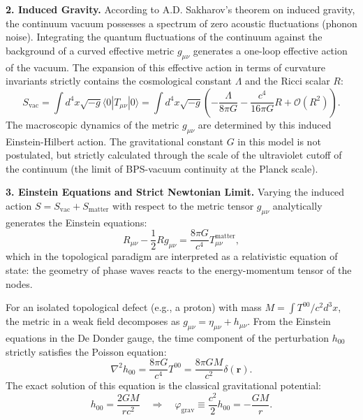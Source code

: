 \documentclass[11pt,a4paper]{article}
\begin{document}
	\textbf{2. Induced Gravity.}
	According to A.D. Sakharov's theorem on induced gravity, the continuum vacuum possesses a spectrum of zero acoustic fluctuations (phonon noise). Integrating the quantum fluctuations of the continuum against the background of a curved effective metric $g_{\mu\nu}$ generates a one-loop effective action of the vacuum. 
	The expansion of this effective action in terms of curvature invariants strictly contains the cosmological constant $\Lambda$ and the Ricci scalar $R$:
	\begin{equation}
		S_{\text{vac}} = \int d^4x \sqrt{-g} \langle 0 | T_{\mu\nu} | 0 \rangle = \int d^4x \sqrt{-g} \left( - \frac{\Lambda}{8\pi G} - \frac{c^4}{16\pi G} R + \mathcal{O}(R^2) \right).
	\end{equation}
	The macroscopic dynamics of the metric $g_{\mu\nu}$ are determined by this induced Einstein-Hilbert action. The gravitational constant $G$ in this model is not postulated, but strictly calculated through the scale of the ultraviolet cutoff of the continuum (the limit of BPS-vacuum continuity at the Planck scale).
	
	\textbf{3. Einstein Equations and Strict Newtonian Limit.}
	Varying the induced action $S = S_{\text{vac}} + S_{\text{matter}}$ with respect to the metric tensor $g_{\mu\nu}$ analytically generates the Einstein equations:
	\begin{equation}
		R_{\mu\nu} - \frac{1}{2}R g_{\mu\nu} = \frac{8\pi G}{c^4} T_{\mu\nu}^{\text{matter}},
	\end{equation}
	which in the topological paradigm are interpreted as a relativistic equation of state: the geometry of phase waves reacts to the energy-momentum tensor of the nodes.
	
	For an isolated topological defect (e.g., a proton) with mass $M = \int T^{00}/c^2 d^3x$, the metric in a weak field decomposes as $g_{\mu\nu} = \eta_{\mu\nu} + h_{\mu\nu}$. From the Einstein equations in the De Donder gauge, the time component of the perturbation $h_{00}$ strictly satisfies the Poisson equation:
	\begin{equation}
		\nabla^2 h_{00} = \frac{8\pi G}{c^4} T^{00} = \frac{8\pi G M}{c^2} \delta(\mathbf{r}).
	\end{equation}
	The exact solution of this equation is the classical gravitational potential:
	\begin{equation}
		h_{00} = \frac{2 G M}{r c^2} \quad \Longrightarrow \quad \varphi_{\text{grav}} \equiv \frac{c^2}{2} h_{00} = - \frac{GM}{r}.
	\end{equation}
	
\end{document}
